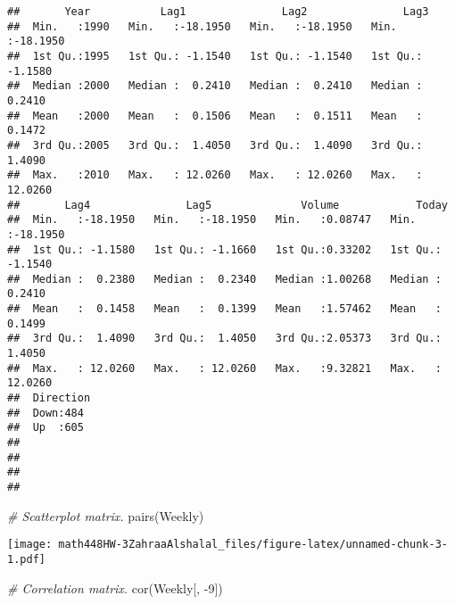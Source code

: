 \documentclass[
]{article}
\newenvironment{Shaded}{\begin{snugshade}}{\end{snugshade}}
\newcommand{\CommentTok}[1]{\textcolor[rgb]{0.56,0.35,0.01}{\textit{#1}}}
\newcommand{\DecValTok}[1]{\textcolor[rgb]{0.00,0.00,0.81}{#1}}
\newcommand{\FunctionTok}[1]{\textcolor[rgb]{0.00,0.00,0.00}{#1}}
\newcommand{\NormalTok}[1]{#1}
\newcommand{\SpecialCharTok}[1]{\textcolor[rgb]{0.00,0.00,0.00}{#1}}
\begin{document}
\begin{verbatim}
##       Year           Lag1               Lag2               Lag3         
##  Min.   :1990   Min.   :-18.1950   Min.   :-18.1950   Min.   :-18.1950  
##  1st Qu.:1995   1st Qu.: -1.1540   1st Qu.: -1.1540   1st Qu.: -1.1580  
##  Median :2000   Median :  0.2410   Median :  0.2410   Median :  0.2410  
##  Mean   :2000   Mean   :  0.1506   Mean   :  0.1511   Mean   :  0.1472  
##  3rd Qu.:2005   3rd Qu.:  1.4050   3rd Qu.:  1.4090   3rd Qu.:  1.4090  
##  Max.   :2010   Max.   : 12.0260   Max.   : 12.0260   Max.   : 12.0260  
##       Lag4               Lag5              Volume            Today         
##  Min.   :-18.1950   Min.   :-18.1950   Min.   :0.08747   Min.   :-18.1950  
##  1st Qu.: -1.1580   1st Qu.: -1.1660   1st Qu.:0.33202   1st Qu.: -1.1540  
##  Median :  0.2380   Median :  0.2340   Median :1.00268   Median :  0.2410  
##  Mean   :  0.1458   Mean   :  0.1399   Mean   :1.57462   Mean   :  0.1499  
##  3rd Qu.:  1.4090   3rd Qu.:  1.4050   3rd Qu.:2.05373   3rd Qu.:  1.4050  
##  Max.   : 12.0260   Max.   : 12.0260   Max.   :9.32821   Max.   : 12.0260  
##  Direction 
##  Down:484  
##  Up  :605  
##            
##            
##            
## 
\end{verbatim}

\begin{Shaded}
\begin{Highlighting}[]
\CommentTok{\# Scatterplot matrix.}
\FunctionTok{pairs}\NormalTok{(Weekly)}
\end{Highlighting}
\end{Shaded}

\texttt{[image: math448HW-3ZahraaAlshalal\_files/figure-latex/unnamed-chunk-3-1.pdf]}

\begin{Shaded}
\begin{Highlighting}[]
\CommentTok{\# Correlation matrix.}
\FunctionTok{cor}\NormalTok{(Weekly[, }\SpecialCharTok{{-}}\DecValTok{9}\NormalTok{])}
\end{Highlighting}
\end{Shaded}
\end{document}
